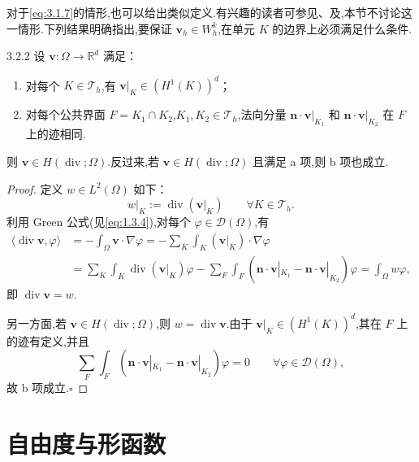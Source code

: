 对于\eqref{eq:3.1.7}的情形,也可以给出类似定义.有兴趣的读者可参见、及,本节不讨论这一情形.下列结果明确指出,要保证 \(\boldsymbol{v}_h\in W_h^k\),在单元 \(K\) 的边界上必须满足什么条件.

\begin{proposition}[]{3.2.2}
设 \(\boldsymbol{v}\colon\Omega\to\mathbb R^d\) 满足：
\begin{enumerate}[label=\alph*.,leftmargin=*]
  \item 对每个 \(K\in\mathcal T_h\),有 \(\boldsymbol{v}|_K\in(H^1(K))^d\)；
  \item 对每个公共界面 \(F=K_1\cap K_2\),\(K_1,K_2\in\mathcal T_h\),法向分量 \(\boldsymbol{n}\cdot\boldsymbol{v}|_{K_1}\) 和 \(\boldsymbol{n}\cdot\boldsymbol{v}|_{K_2}\) 在 \(F\) 上的迹相同.
\end{enumerate}
则 \(\boldsymbol{v}\in H(\operatorname{div};\Omega)\).反过来,若 \(\boldsymbol{v}\in H(\operatorname{div};\Omega)\) 且满足 a 项,则 b 项也成立.
\end{proposition}

\begin{proof}
定义 \(w\in L^2(\Omega)\) 如下：
\[
  w|_K:=\operatorname{div}(\boldsymbol{v}|_K)\qquad\forall K\in\mathcal T_h.
\]
利用 Green 公式(见\eqref{eq:1.3.4}),对每个 \(\varphi\in\mathcal D(\Omega)\),有
\[
  \begin{aligned}
    \langle\operatorname{div}\boldsymbol{v},\varphi\rangle
    &=-\int_\Omega\boldsymbol{v}\cdot\nabla\varphi
      =-\sum_K\int_K(\boldsymbol{v}|_K)\cdot\nabla\varphi\\
    &=\sum_K\int_K\operatorname{div}(\boldsymbol{v}|_K)\varphi
      -\sum_F\int_F(\boldsymbol{n}\cdot\boldsymbol{v}|_{K_1}-\boldsymbol{n}\cdot\boldsymbol{v}|_{K_2})\varphi
      =\int_\Omega w\varphi,
  \end{aligned}
\]
即 \(\operatorname{div}\boldsymbol{v}=w\).

另一方面,若 \(\boldsymbol{v}\in H(\operatorname{div};\Omega)\),则 \(w=\operatorname{div}\boldsymbol{v}\).由于 \(\boldsymbol{v}|_K\in(H^1(K))^d\),其在 \(F\) 上的迹有定义,并且
\[
  \sum_F\int_F(\boldsymbol{n}\cdot\boldsymbol{v}|_{K_1}-\boldsymbol{n}\cdot\boldsymbol{v}|_{K_2})\varphi=0
  \qquad \forall\varphi\in\mathcal D(\Omega),
\]
故 b 项成立.\hfill\(\square\)
\end{proof}

\section{自由度与形函数}\label{sec:3.3}

